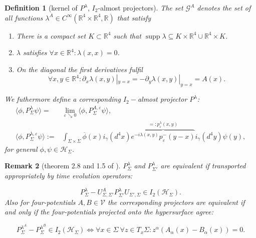\documentclass[b5paper,draft,openbib,12pt]{memoir}
\newtheorem{Def}{Definition}
\newtheorem{Remark}[Def]{Remark}
\DeclareMathOperator*{\supp}{supp}
\begin{document}
\begin{Def}[kernel of \(P^\lambda\), \(I_2\)-almost projectors]\label{def:lambda}
The set \(\mathcal{G}^A\) denotes the set of all functions \(\lambda^A \in C^\infty (\mathbb{R}^4\times \mathbb{R}^4, \mathbb{R})\) that satisfy
\begin{enumerate}[label= \roman*) ]
\item There is a compact set \(K\subset \mathbb{R}^4\) such that \(\supp \lambda \subseteq K\times \mathbb{R}^4 \cup \mathbb{R}^4 \times K\).
\item \(\lambda\) satisfies \(\forall x \in \mathbb{R}^4: \lambda(x,x)=0\).
\item On the diagonal the first derivatives fulfil 
\begin{equation}
\forall x,y\in\mathbb{R}^4: \partial_x \lambda(x,y)|_{y=x}=-\partial_y \lambda(x,y)|_{y=x} = A(x).
\end{equation}
\end{enumerate}
We futhermore define a corresponding \(I_2-\)almost projector \(P^\lambda\):
\begin{align}
\langle \phi, P^\lambda_\Sigma \psi\rangle =& \lim_{\varepsilon \searrow 0} \langle \phi, P^{A,\varepsilon}_\Sigma \psi\rangle ,\\\label{def:p lambda}
\langle \phi, P^{\lambda,\varepsilon}_\Sigma \psi\rangle :=&
\int_{\Sigma\times\Sigma}\overline{\phi}(x)i_\gamma(d^4x) 
\overbrace{e^{-i \lambda(x,y)} p^-_\varepsilon(y-x)}^{=:p^\lambda_\varepsilon(x,y)}i_\gamma(d^4y) \psi(y),
\end{align}
for general \(\phi, \psi \in \mathcal{H}_\Sigma\).
\end{Def}

\begin{Remark}[theorem 2.8 and  1.5 of \cite{ivp2}]\label{main results of ivp2}
\(P_{\Sigma}^\lambda\) and \( P_{\Sigma'}^\lambda\) are 
equivalent if transported appropriately by time evolution 
operators:

\begin{equation}
P_{\Sigma}^\lambda-U_{\Sigma,\Sigma'}^A P_{\Sigma'}^\lambda U_{\Sigma',\Sigma}\in I_2(\mathcal{H}_\Sigma).
\end{equation}
Also for four-potentials 
\(A,B\in \mathcal{V}\) 
the corresponding projectors are equivalent if and only 
if the four-potentials projected onto the hypersurface 
agree:

\begin{equation}\label{equiv:pLambda}
P_{\Sigma}^{\lambda^A} - P_{\Sigma}^{\lambda^B} \in I_2(\mathcal{H}_\Sigma) \iff \forall x\in \Sigma~ \forall z\in T_x \Sigma: z^\alpha(A_\alpha(x)-B_\alpha(x))=0.
\end{equation}
\end{Remark}
\end{document}
